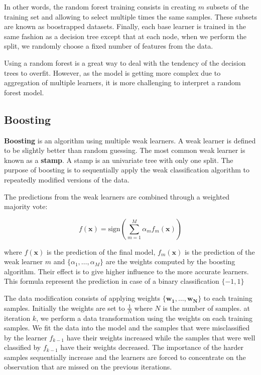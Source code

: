 \documentclass[12pt]{report}
\begin{document}
            In other words, the random forest training consists in creating $m$ subsets of the training set and allowing to select multiple times the same samples. These subsets are known as boostrapped datasets. Finally, each base learner is trained in the same fashion as a decision tree except that at each node, when we perform the split, we randomly choose a fixed number of features from the data.
            
            Using a random forest is a great way to deal with the tendency of the decision trees to overfit. However, as the model is getting more complex due to aggregation of multiple learners, it is more challenging to interpret a random forest model.
            
        \subsection{Boosting}
            \textbf{Boosting} is an algorithm using multiple weak learners. A weak learner is defined to be slightly better than random guessing. The most common weak learner is known as a  \textbf{stamp}. A stamp is an univariate tree with only one split. The purpose of boosting is to sequentially apply the weak classification algorithm to repeatedly modified versions of the data.
            
            The predictions from the weak learners are combined through a weighted majority vote:
            
            \begin{equation}
                f(\boldsymbol{x}) = \text{sign}\left(\sum_{m=1}^{M}\alpha_m f_m(\boldsymbol{x})\right)
            \end{equation}
            
            where $f(\boldsymbol{x})$ is the prediction of the final model, $f_m(\boldsymbol{x})$ is the prediction of the weak learner $m$ and $\{\alpha_1, \dots, \alpha_M\}$ are the weights computed by the boosting algorithm. Their effect is to give higher influence to the more accurate 
            learners. This formula represent the prediction in case of a binary classification $\{-1, 1\}$
                        
            The data modification consists of applying weights $\{\boldsymbol{w_1}, \dots, \boldsymbol{w_N}\}$ to each training samples. Initially the weights are set to $\frac{1}{N}$ where $N$ is the number of samples. at iteration $k$, we perform a data transformation using the weights on each training samples. We fit the data into the model and the samples that were misclassified by the learner $f_{k-1}$ have their weights increased while the samples that were well classified by $f_{k-1}$ have their weights decreased. The importance of the harder samples sequentially increase and the learners are forced to concentrate on the observation that are missed on the previous iterations.
            
\end{document}
